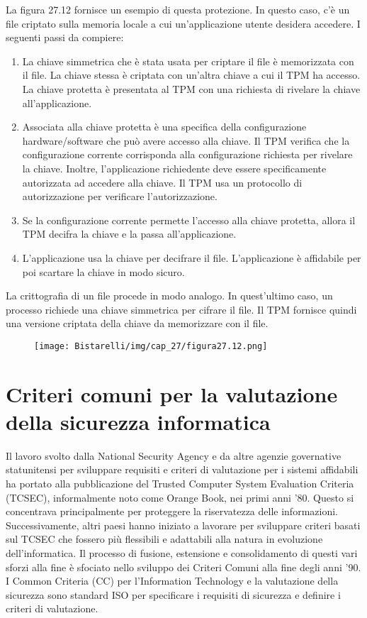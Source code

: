 \singlespacing

La figura 27.12 fornisce un esempio di questa protezione. In questo caso, c'è un file criptato sulla memoria locale a cui un'applicazione utente desidera accedere. I seguenti passi da compiere:
\begin{enumerate}
    \item La chiave simmetrica che è stata usata per criptare il file è memorizzata con il file. La chiave stessa è criptata con un'altra chiave a cui il TPM ha accesso. La chiave protetta è presentata al TPM con una richiesta di rivelare la chiave all'applicazione.
    
    \item Associata alla chiave protetta è una specifica della configurazione hardware/software che può avere accesso alla chiave. Il TPM verifica che la configurazione corrente corrisponda alla configurazione richiesta per rivelare la chiave. Inoltre, l'applicazione richiedente deve essere specificamente autorizzata ad accedere alla chiave. Il TPM usa un protocollo di autorizzazione per verificare l'autorizzazione.
    
    \item Se la configurazione corrente permette l'accesso alla chiave protetta, allora il TPM decifra la chiave e la passa all'applicazione.
    
    \item L'applicazione usa la chiave per decifrare il file. L'applicazione è affidabile per poi scartare la chiave in modo sicuro.
\end{enumerate}
La crittografia di un file procede in modo analogo. In quest'ultimo caso, un processo richiede una chiave simmetrica per cifrare il file. Il TPM fornisce quindi una versione criptata della chiave da memorizzare con il file.

\begin{figure}[H]
	\centering
    \texttt{[image: Bistarelli/img/cap\_27/figura27.12.png]}
\end{figure}

\section{Criteri comuni per la valutazione della sicurezza informatica}

Il lavoro svolto dalla National Security Agency e da altre agenzie governative statunitensi per sviluppare requisiti e criteri di valutazione per i sistemi affidabili ha portato alla pubblicazione del Trusted Computer System Evaluation Criteria (TCSEC), informalmente noto come Orange Book, nei primi anni '80. Questo si concentrava principalmente per proteggere la riservatezza delle informazioni. Successivamente, altri paesi hanno iniziato a lavorare per sviluppare criteri basati sul TCSEC che fossero più flessibili e adattabili alla natura in evoluzione dell'informatica. Il processo di fusione, estensione e consolidamento di questi vari sforzi alla fine è sfociato nello sviluppo dei Criteri Comuni alla fine degli anni '90. I Common Criteria (CC) per l'Information Technology e la valutazione della sicurezza sono standard ISO per specificare i requisiti di sicurezza e definire i criteri di valutazione.

